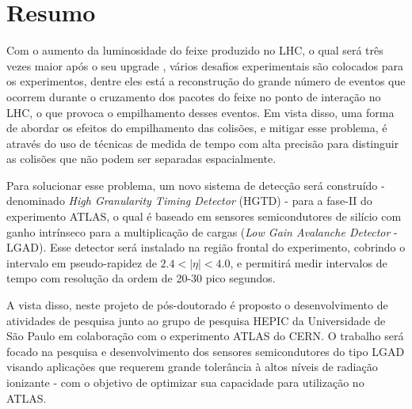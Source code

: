 \chapter*{Resumo}


Com o aumento da luminosidade do feixe produzido no LHC, o qual será três vezes maior após o seu upgrade \cite{HL_LHC,tdr}, vários desafios experimentais são colocados para os experimentos, dentre eles está a reconstrução do grande número de eventos que ocorrem durante o cruzamento dos pacotes do feixe no ponto de interação no LHC, o que provoca o empilhamento desses eventos.
Em vista disso, uma forma de abordar os efeitos do empilhamento das colisões, e mitigar esse problema, é através do uso de técnicas de medida de tempo com alta precisão para distinguir as colisões que não podem ser separadas espacialmente. 

Para solucionar esse problema, um novo sistema de detecção será construído - denominado {\it High Granularity Timing Detector} (HGTD) - para a fase-II do experimento ATLAS, o qual é baseado em sensores semicondutores de silício com ganho intrínseco para a multiplicação de cargas
({\it Low Gain Avalanche Detector} - LGAD). Esse detector será instalado na região frontal do experimento, cobrindo o intervalo em pseudo-rapidez de $2.4< |\eta| <4.0$, e permitirá medir intervalos de tempo com resolução da ordem de 20-30 pico segundos.


A vista disso, neste projeto de pós-doutorado é proposto o desenvolvimento de atividades de pesquisa junto ao grupo de pesquisa HEPIC da Universidade de São Paulo em colaboração com o experimento ATLAS do CERN. O trabalho será focado na pesquisa e desenvolvimento dos sensores semicondutores do tipo LGAD visando aplicações que requerem grande tolerância à altos níveis de radiação ionizante \cite{JIN_LGAD,NIMA_LGAD,NIMA_LGAD_I,NIMA_LGAD_II,NIMA_LGAD_III} - com o objetivo de optimizar sua capacidade para utilização no ATLAS. %

